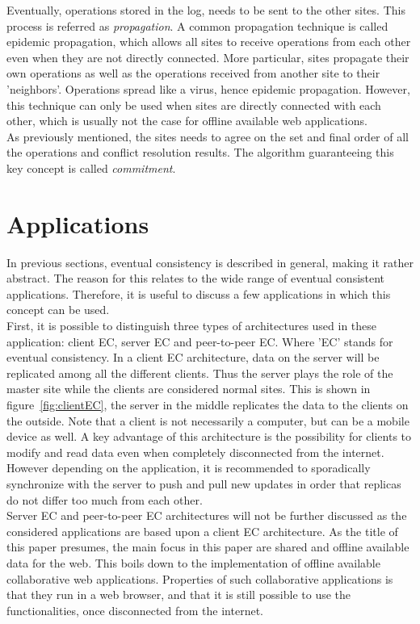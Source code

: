 \documentclass[a4paper,12pt]{report}
\begin{document}
\indent Eventually, operations stored in the log, needs to be sent to the other sites. This process is referred as \textit{propagation}. A common propagation technique is called epidemic propagation, which allows all sites to receive operations from each other even when they are not directly connected. More particular, sites propagate their own operations as well as the operations received from another site to their 'neighbors'. Operations spread like a virus, hence epidemic propagation. However, this technique can only be used when sites are directly connected with each other, which is usually not the case for offline available web applications. \\
\indent As previously mentioned, the sites needs to agree on the set and final order of all the operations and conflict resolution results. The algorithm guaranteeing this key concept is called \textit{commitment}. 

\section{Applications}\label{sec:Applications}

In previous sections, eventual consistency is described in general, making it rather abstract. The reason for this relates to the wide range of eventual consistent applications. Therefore, it is useful to discuss a few applications in which this concept can be used. \\
First, it is possible to distinguish three types of architectures used in these application: client EC, server EC and peer-to-peer EC. Where 'EC' stands for eventual consistency. In a client EC architecture, data on the server will be replicated among all the different clients. Thus the server plays the role of the master site while the clients are considered normal sites. This is shown in figure~\ref{fig:clientEC}, the server in the middle replicates the data to the clients on the outside. Note that a client is not necessarily a computer, but can be a mobile device as well. A key advantage of this architecture is the possibility for clients to modify and read data even when completely disconnected from the internet. However depending on the application, it is recommended to sporadically synchronize with the server to push and pull new updates in order that replicas do not differ too much from each other. \\
Server EC and peer-to-peer EC architectures will not be further discussed as the considered applications are based upon a client EC architecture. As the title of this paper presumes, the main focus in this paper are shared and offline available data for the web. This boils down to the implementation of offline available collaborative web applications. Properties of such collaborative applications is that they run in a web browser, and that it is still possible to use the functionalities, once disconnected from the internet. 
\end{document}

